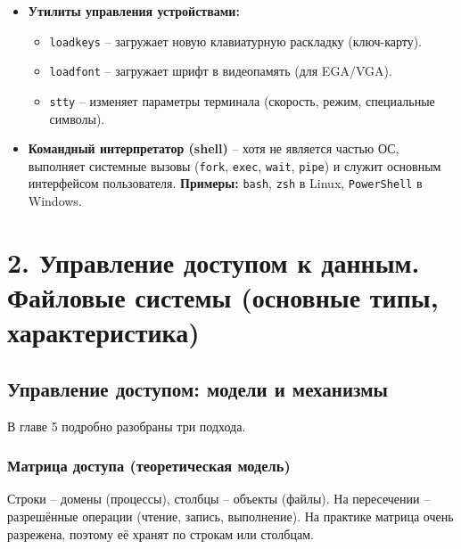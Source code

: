 \documentclass[a4paper,12pt]{article}
\begin{document}
\begin{itemize}
\begin{itemize}
    \end{itemize}
    \item \textbf{Утилиты управления устройствами:}
    \begin{itemize}
        \item \texttt{loadkeys} – загружает новую клавиатурную раскладку (ключ-карту).
        \item \texttt{loadfont} – загружает шрифт в видеопамять (для EGA/VGA).
        \item \texttt{stty} – изменяет параметры терминала (скорость, режим, специальные символы).
    \end{itemize}
    \item \textbf{Командный интерпретатор (shell)} – хотя не является частью ОС, выполняет системные вызовы (\texttt{fork}, \texttt{exec}, \texttt{wait}, \texttt{pipe}) и служит основным интерфейсом пользователя. \textbf{Примеры:} \texttt{bash}, \texttt{zsh} в Linux, \texttt{PowerShell} в Windows.
\end{itemize}

\section*{2. Управление доступом к данным. Файловые системы (основные типы, характеристика)}

\subsection{Управление доступом: модели и механизмы}
В главе 5 подробно разобраны три подхода.

\subsubsection{Матрица доступа (теоретическая модель)}
Строки – домены (процессы), столбцы – объекты (файлы). На пересечении – разрешённые операции (чтение, запись, выполнение). На практике матрица очень разрежена, поэтому её хранят по строкам или столбцам.
\end{document}
